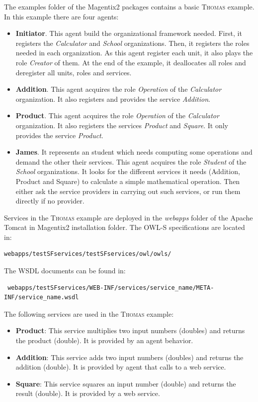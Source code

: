 The examples folder of the Magentix2 packages contains a basic \textsc{Thomas} example. In this example there are four agents:
\begin{itemize}
 \item \textbf{Initiator}. This agent build the organizational framework needed. First, it registers the \textit{Calculator} and \textit{School} organizations. Then, it registers the roles needed in each organization. As this agent register each unit, it also plays the role \textit{Creator} of them. At the end of the example, it deallocates all roles and deregister all units, roles and services.
 \item \textbf{Addition}. This agent acquires the role \textit{Operation} of the \textit{Calculator} organization. It also registers and provides the service \textit{Addition}.
 \item \textbf{Product}. This agent acquires the role \textit{Operation} of the \textit{Calculator} organization. It also registers the services \textit{Product} and \textit{Square}. It only provides the service \textit{Product}.
 \item \textbf{James}. It represents an student which needs computing some operations and demand the other their services. This agent acquires the role \textit{Student} of the \textit{School} organizations. It looks for the different services it needs (Addition, Product and Square) to calculate a simple mathematical operation. Then either ask the service providers in carrying out such services, or run them directly if no provider.
\end{itemize}

Services in the \textsc{Thomas} example are deployed in the \textit{webapps} folder of the Apache Tomcat in Magentix2 installation folder. The OWL-S specifications are located in: 
\begin{lstlisting}
webapps/testSFservices/testSFservices/owl/owls/
\end{lstlisting}
The WSDL documents can be found in:
\begin{lstlisting}
 webapps/testSFservices/WEB-INF/services/service_name/META-INF/service_name.wsdl
\end{lstlisting}

The following services are used in the \textsc{Thomas} example:
\begin{itemize}
 \item \textbf{Product}: This service multiplies two input numbers (doubles) and returns the product (double). It is provided by an agent behavior.
 \item \textbf{Addition}: This service adds two input numbers (doubles) and returns the addition (double). It is provided by agent that calls to a web service.
 \item \textbf{Square}: This service squares an input number (double) and returns the result (double). It is provided by a web service.
\end{itemize}

